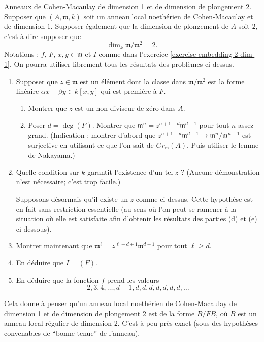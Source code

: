 \begin{exercise}
\label{exercise-CM-dim-1-embedding-dim-2}
Anneaux de Cohen-Macaulay de dimension 1 et de dimension de plongement 2.
Supposer que $(A, {\mathfrak m}, k)$ soit un anneau local noethérien de
Cohen-Macaulay
et de dimension $1$. Supposer également que la dimension de plongement de $A$ soit
$2$, c'est-à-dire supposer que
$$
\dim_k {\mathfrak m}/{\mathfrak m}^2 = 2.
$$
Notations : $f$, $F$, $x, y\in {\mathfrak m}$ et $I$ comme dans
l'exercice \ref{exercise-embedding-2-dim-1}. On pourra utiliser librement
tous les résultats des problèmes ci-dessus.
\begin{enumerate}
\item Supposer que $z\in {\mathfrak m}$ est un élément dont la classe
dans ${\mathfrak m}/{\mathfrak m}^2$ est la forme linéaire
$\alpha \bar x + \beta \bar y \in k[\bar x, \bar y]$
qui est première à $F$.
\begin{enumerate}
\item Montrer que $z$ est un non-diviseur de zéro dans $A$.
\item Poser $d = \deg(F)$.
Montrer que ${\mathfrak m}^n = z^{n + 1-d}{\mathfrak m}^{d-1}$
pour tout $n$ assez grand. (Indication : montrer d'abord que
$z^{n + 1-d}{\mathfrak m}^{d-1} \to {\mathfrak m}^n/{\mathfrak m}^{n + 1}$
est surjective en utilisant ce que l'on sait de $Gr_{\mathfrak m}(A)$. Puis utiliser le lemme de Nakayama.)
\end{enumerate}
\item Quelle condition sur $k$ garantit l'existence
d'un tel $z$ ? (Aucune démonstration n'est nécessaire; c'est trop facile.)

\noindent
Supposons désormais qu'il existe un $z$ comme ci-dessus. Cette hypothèse
est en fait sans restriction essentielle (au sens où l'on peut se ramener à
la situation où elle est satisfaite afin d'obtenir les résultats des
parties (d) et (e) ci-dessous).
\item Montrer maintenant que ${\mathfrak m}^\ell = z^{\ell - d + 1} {\mathfrak m}^{d-1}$
pour tout $\ell \geq d$.
\item En déduire que $I = (F)$.
\item En déduire que la fonction $f$ prend les valeurs
$$
2, 3, 4, \ldots, d-1, d, d, d, d, d, d, d, \ldots
$$
\end{enumerate}
\end{exercise}

\begin{remark}
\label{remark-CM-dim-1-embedding-dim-2}
Cela donne à penser qu'un anneau local noethérien de Cohen-Macaulay de dimension 1
et de dimension de plongement 2 est de la forme $B/FB$, où $B$ est un anneau local
régulier de dimension 2. C'est à peu près exact (sous des hypothèses
convenables de ``bonne tenue'' de l'anneau).
\end{remark}






